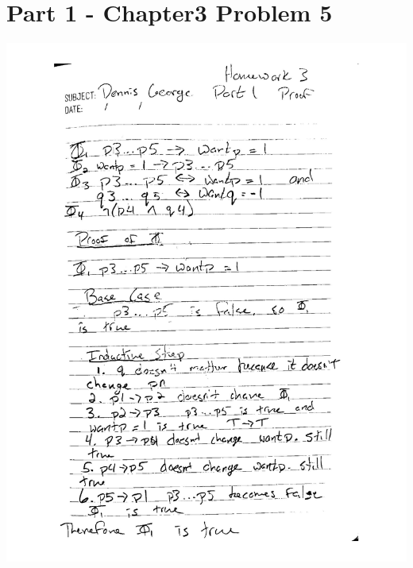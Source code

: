\documentclass[12pt]{article}
\begin{document}
\maketitle
    \section{Part 1 - Chapter3 Problem 5}

        \includegraphics[scale=0.8]{Assignment3/1.pdf}
        \newpage
\end{document}
